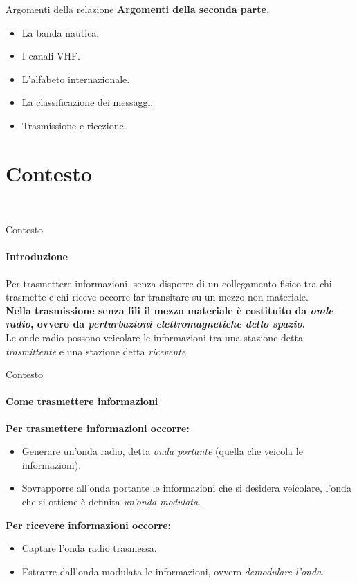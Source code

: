 \documentclass[aspectratio=169]{beamer}
\begin{document}
	\begin{frame}{Argomenti della relazione}
		\textbf{Argomenti della seconda parte.}
		\begin{itemize}
			\item La banda nautica.
			\item I canali VHF.
			\item L'alfabeto internazionale. 
			\item La classificazione dei messaggi. 
			\item Trasmissione e ricezione.
		\end{itemize}
	\end{frame}

	\section{Contesto}
	\begin{frame}
		\\
	\end{frame}

	\begin{frame}{Contesto}
		\framesubtitle{Introduzione}
		Per trasmettere informazioni, senza disporre di un collegamento fisico tra chi trasmette e chi riceve occorre far transitare su un mezzo non materiale.\\
		\bigskip
		\textbf{Nella trasmissione senza fili il mezzo materiale è costituito da \emph{onde radio}, ovvero da \emph{perturbazioni elettromagnetiche dello spazio}.}\\
		\bigskip
		Le onde radio possono veicolare le informazioni tra una stazione detta \emph{trasmittente} e una stazione detta \emph{ricevente}.\\
	\end{frame}

	\begin{frame}{Contesto}
		\framesubtitle{Come trasmettere informazioni}
			\textbf{Per trasmettere informazioni occorre:}\\
		\begin{itemize}
			\item Generare un'onda radio, detta \emph{onda portante} (quella che veicola le informazioni).
			\item Sovrapporre all'onda portante le informazioni che si desidera veicolare, l'onda che si ottiene è definita \emph{un'onda modulata}.
		\end{itemize} 
		\bigskip
		\textbf{Per ricevere informazioni occorre:}
		\begin{itemize}
			\item Captare l'onda radio trasmessa.
			\item Estrarre dall'onda modulata le informazioni, ovvero \emph{demodulare l'onda}.
		\end{itemize}
	\end{frame}
\end{document}
